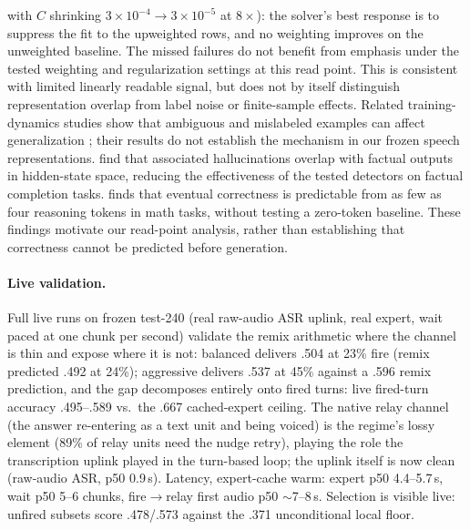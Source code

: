 with $C$ shrinking $3{\times}10^{-4}\to3{\times}10^{-5}$ at
$8{\times}$): the solver's best response is to suppress the fit to
the upweighted rows, and no weighting improves on the unweighted
baseline. The missed failures do not benefit from emphasis under the tested
weighting and regularization settings at this read point. This is
consistent with limited linearly readable signal, but does not by
itself distinguish representation overlap from label noise or
finite-sample effects. Related training-dynamics studies show that
ambiguous and mislabeled examples can affect generalization
\citep{swayamdipta2020cartography,pleiss2020aum}; their results do not
establish the mechanism in our frozen speech representations.
\citet{cheang2025recall} find that associated
hallucinations overlap with factual outputs in hidden-state space,
reducing the effectiveness of the tested detectors on factual
completion tasks. \citet{david2025temporal} finds that eventual
correctness is predictable from as few as four reasoning tokens in
math tasks, without testing a zero-token baseline. These findings
motivate our read-point analysis, rather than establishing that
correctness cannot be predicted before generation.

\paragraph{Live validation.} Full live runs on frozen test-240 (real
raw-audio ASR uplink, real expert, wait paced at one chunk per second)
validate the remix arithmetic where the channel is thin and expose
where it is not: balanced delivers .504 at 23\% fire (remix predicted
.492 at 24\%); aggressive delivers .537 at 45\% against a .596 remix
prediction, and the gap decomposes entirely onto fired turns:
live fired-turn accuracy .495--.589 vs.\ the .667 cached-expert
ceiling. The native relay channel (the answer re-entering as a
text unit and being voiced) is the regime's lossy element (89\% of
relay units need the nudge retry), playing the role the
transcription uplink played in the turn-based loop; the uplink itself
is now clean (raw-audio ASR, p50 0.9\,s). Latency, expert-cache warm:
expert p50 4.4--5.7\,s, wait p50 5--6 chunks, fire$\to$relay first
audio p50 $\sim$7--8\,s. Selection is visible live: unfired subsets
score .478/.573 against the .371 unconditional local floor.

